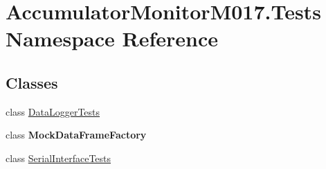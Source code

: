 \hypertarget{namespace_accumulator_monitor_m017_1_1_tests}{}\section{Accumulator\+Monitor\+M017.\+Tests Namespace Reference}
\label{namespace_accumulator_monitor_m017_1_1_tests}
\subsection*{Classes}
\begin{DoxyCompactItemize}
\item 
class \hyperlink{class_accumulator_monitor_m017_1_1_tests_1_1_data_logger_tests}{Data\+Logger\+Tests}
\item 
class {\bfseries Mock\+Data\+Frame\+Factory}
\item 
class \hyperlink{class_accumulator_monitor_m017_1_1_tests_1_1_serial_interface_tests}{Serial\+Interface\+Tests}
\end{DoxyCompactItemize}
